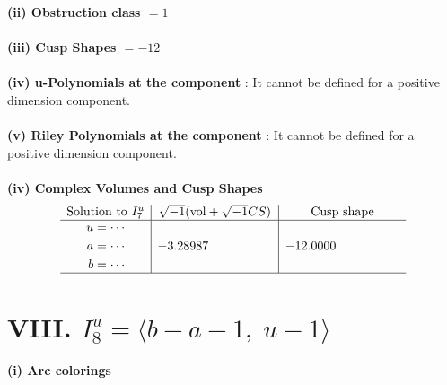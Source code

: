 \documentclass[1p]{elsarticle_modified}
\theoremstyle{definition}
\newcommand{\I}{\sqrt{-1}}
\begin{document}
\flushleft \textbf{(ii) Obstruction class $= 1$}\\~\\
\flushleft \textbf{(iii) Cusp Shapes $= -12$}\\~\\
\flushleft \textbf{(iv) u-Polynomials at the component} : It cannot be defined for a positive dimension component.\\~\\
\flushleft \textbf{(v) Riley Polynomials at the component} : It cannot be defined for a positive dimension component.\\~\\
\newpage\flushleft \textbf{(iv) Complex Volumes and Cusp Shapes}
$$\begin{array}{c|c|c} 
\text{Solution to }I^u_{7}& \I (\text{vol} + \sqrt{-1}CS) & \text{Cusp shape}\\
 \hline 
\begin{aligned}
u &= \cdots \\
a &= \cdots \\
b &= \cdots\end{aligned}
 & -3.28987\phantom{ +0.000000I} & -12.0000\phantom{ +0.000000I}\\
 \hline 
 \end{array}
$$\newpage\renewcommand{\arraystretch}{1}
\centering \section*{VIII. $I^u_{8}= \langle b- a-1,\;u-1 \rangle$}
\flushleft \textbf{(i) Arc colorings}\\
\end{document}

